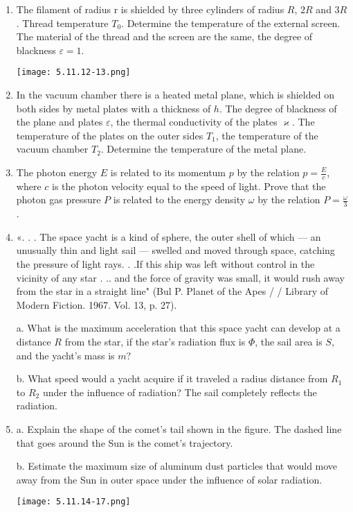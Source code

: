 \documentclass{article}
\begin{document}
\begin{enumerate}[label=5.11.\arabic*]
\item The filament of radius r is shielded by three cylinders of radius $R$, $2R$ and $3R$. Thread temperature $T_0$. Determine the temperature of the external screen. The material of the thread and the screen are the same, the degree of blackness $\varepsilon = 1$.

\begin{center}
    \texttt{[image: 5.11.12-13.png]}
\end{center}


\item In the vacuum chamber there is a heated metal plane, which is shielded on both sides by metal plates with a thickness of $h$. The degree of blackness of the plane and plates $\varepsilon$, the thermal conductivity of the plates $\varkappa$. The temperature of the plates on the outer sides $T_1$, the temperature of the vacuum chamber $T_2$. Determine the temperature of the metal plane.

\item The photon energy $E$ is related to its momentum $p$ by the relation $p = \frac{E}{c}$, where $c$ is the photon velocity equal to the speed of light. Prove that the photon gas pressure $P$ is related to the energy density $\omega$ by the relation $P = \frac{\omega}{3}$.

\item «. . . The space yacht is a kind of sphere, the outer shell of which — an unusually thin and light sail — swelled and moved through space, catching the pressure of light rays. . .If this ship was left without control in the vicinity of any star . .. and the force of gravity was small, it would rush away from the star in a straight line" (Bul P. Planet of the Apes / / Library of Modern Fiction. 1967. Vol. 13, p. 27). 

a. What is the maximum acceleration that this space yacht can develop at a distance $R$ from the star, if the star's radiation flux is $\Phi$, the sail area is $S$, and the yacht's mass is $m$? 

b. What speed would a yacht acquire if it traveled a radius distance from $R_1$ to $R_2$ under the influence of radiation? The sail completely reflects the radiation.

\item a. Explain the shape of the comet's tail shown in the figure. The dashed line that goes around the Sun is the comet's trajectory. 

b. Estimate the maximum size of aluminum dust particles that would move away from the Sun in outer space under the influence of solar radiation.

\begin{center}
    \texttt{[image: 5.11.14-17.png]}
\end{center}




\end{enumerate}
\end{document}
